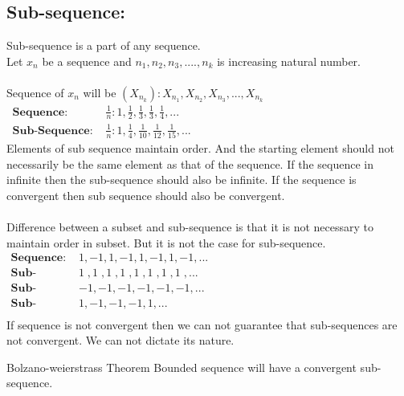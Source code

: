 \documentclass{article}
\begin{document}
\subsection{Sub-sequence:}
Sub-sequence is a part of any sequence.\\
Let $x_n$ be a sequence and $n_1,n_2,n_3,....,n_k$ is increasing natural number.\\\\
Sequence of $x_n$ will be $(X_{n_k}): X_{n_1},X_{n_2},X_{n_3},...,X_{n_k}$\\
\begin{align*}
    \textbf{Sequence: }     & \displaystyle\frac{1}{n}: 1,\frac{1}{2},\frac{1}{3},\frac{1}{3},\frac{1}{4},...\hspace{8cm}    \\
    \textbf{Sub-Sequence: } & \displaystyle\frac{1}{n}: 1,\frac{1}{4},\frac{1}{10},\frac{1}{12},\frac{1}{15},...\hspace{8cm}
\end{align*}
Elements of sub sequence maintain order. And the starting element should not necessarily be the same element as that of the sequence. If the sequence in infinite then the sub-sequence should also be infinite. If the sequence is convergent then sub sequence should also be convergent.\\\\
Difference between a subset and sub-sequence is that it is not necessary to maintain order in subset. But it is not the case for sub-sequence.
\begin{align*}
    \textbf{Sequence: }     & 1,-1,1,-1,1,-1,1,-1,...\hspace{8cm}             \\
    \textbf{Sub-Sequence: } & 1\;,1\;,1\;,1\;,1\;,1\;,1\;,1\;,...\hspace{8cm} \\
    \textbf{Sub-Sequence: } & -1,-1,-1,-1,-1,-1,...\hspace{8cm}               \\
    \textbf{Sub-Sequence: } & 1,-1,-1,-1,1,...\hspace{8cm}                    \\
\end{align*}
If sequence is not convergent then we can not guarantee that sub-sequences are not convergent. We can not dictate its nature.
\begin{theorem}{Bolzano-weierstrass Theorem}{} Bounded sequence will have a convergent sub-sequence.\\
\end{theorem}
\end{document}
